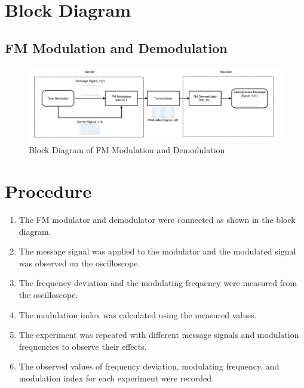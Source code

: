 \documentclass[12pt]{article}
\begin{document}
\section*{Block Diagram}
\subsection*{FM Modulation and Demodulation}
\begin{figure}[H]
    \centering
    \includegraphics[width=\textwidth]{block.png}
    \caption{Block Diagram of FM Modulation and Demodulation}
    \label{fig:fm}
\end{figure}

\section*{Procedure}
\begin{enumerate}
    \item The FM modulator and demodulator were connected as shown in the block diagram.
    \item The message signal was applied to the modulator and the modulated signal was observed on the oscilloscope.
    \item The frequency deviation and the modulating frequency were measured from the oscilloscope.
    \item The modulation index was calculated using the measured values.
    \item The experiment was repeated with different message signals and modulation frequencies to observe their effects.
    \item The observed values of frequency deviation, modulating frequency, and modulation index for each experiment were recorded.
\end{enumerate}
\end{document}
